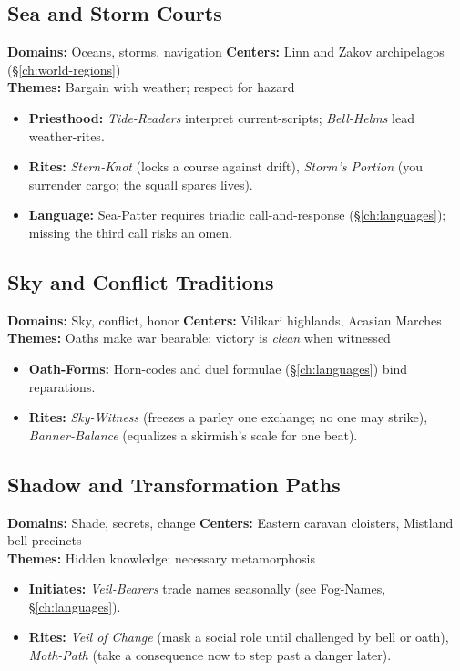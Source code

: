\subsection*{Sea and Storm Courts}
\textbf{Domains:} Oceans, storms, navigation \quad
\textbf{Centers:} Linn and Zakov archipelagos (\S\ref{ch:world-regions}) \\
\textbf{Themes:} Bargain with weather; respect for hazard
\begin{itemize}
  \item \textbf{Priesthood:} \emph{Tide-Readers} interpret current-scripts; \emph{Bell-Helms} lead weather-rites. 
  \item \textbf{Rites:} \emph{Stern-Knot} (locks a course against drift), \emph{Storm's Portion} (you surrender cargo; the squall spares lives).
  \item \textbf{Language:} Sea-Patter requires triadic call-and-response (\S\ref{ch:languages}); missing the third call risks an omen. 
\end{itemize}

\subsection*{Sky and Conflict Traditions}
\textbf{Domains:} Sky, conflict, honor \quad
\textbf{Centers:} Vilikari highlands, Acasian Marches \\
\textbf{Themes:} Oaths make war bearable; victory is \emph{clean} when witnessed
\begin{itemize}
  \item \textbf{Oath-Forms:} Horn-codes and duel formulae (\S\ref{ch:languages}) bind reparations. 
  \item \textbf{Rites:} \emph{Sky-Witness} (freezes a parley one exchange; no one may strike), \emph{Banner-Balance} (equalizes a skirmish's scale for one beat).
\end{itemize}

\subsection*{Shadow and Transformation Paths}
\textbf{Domains:} Shade, secrets, change \quad
\textbf{Centers:} Eastern caravan cloisters, Mistland bell precincts \\
\textbf{Themes:} Hidden knowledge; necessary metamorphosis
\begin{itemize}
  \item \textbf{Initiates:} \emph{Veil-Bearers} trade names seasonally (see Fog-Names, \S\ref{ch:languages}). 
  \item \textbf{Rites:} \emph{Veil of Change} (mask a social role until challenged by bell or oath), \emph{Moth-Path} (take a consequence now to step past a danger later).
\end{itemize}

